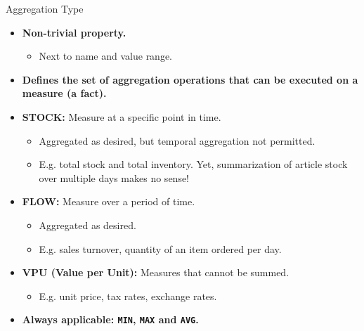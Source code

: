 \begin{frame}{Aggregation Type}
	\begin{itemize}
		\item \textbf{Non-trivial property.}
		      \begin{itemize}
			      \item Next to name and value range.
		      \end{itemize}
		\item \textbf{Defines the set of aggregation operations that can be executed on a measure (a fact).}
		\item \textbf{\color{airforceblue}STOCK:} Measure at a specific point in time.
		      \begin{itemize}
			      \item Aggregated as desired, but temporal aggregation not permitted.
			      \item E.g. total stock and total inventory. Yet, summarization of article stock over multiple days makes no sense!
		      \end{itemize}
		\item \textbf{\color{airforceblue}FLOW:} Measure over a period of time.
		      \begin{itemize}
			      \item Aggregated as desired.
			      \item E.g. sales turnover, quantity of an item ordered per day.
		      \end{itemize}
		\item \textbf{\color{airforceblue}VPU (Value per Unit):} Measures that cannot be summed.
		      \begin{itemize}
			      \item E.g. unit price, tax rates, exchange rates.
		      \end{itemize}
		\item \textbf{Always applicable: \texttt{MIN}, \texttt{MAX} and \texttt{AVG}.}
	\end{itemize}
\end{frame}

